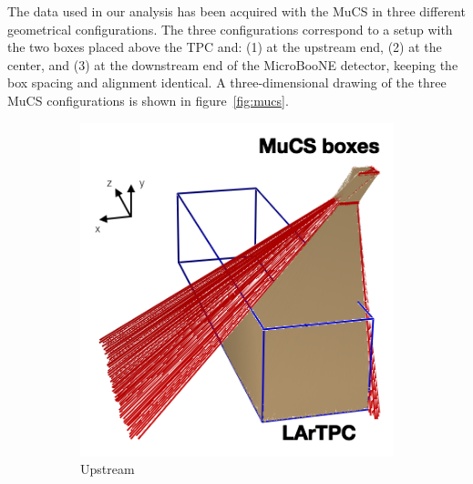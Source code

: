 \documentclass[a4paper,11pt]{article}
\begin{document}
The data used in our analysis has been acquired with the MuCS in three different geometrical configurations. The three configurations correspond to a setup with the two boxes placed above the TPC and: (1) at the upstream end, (2) at the center, and (3) at the downstream end of the MicroBooNE detector, keeping the box spacing and alignment identical.
A three-dimensional drawing of the three MuCS configurations is shown in figure~\ref{fig:mucs}.

\begin{figure}[htbp]
  \begin{subfigure}{0.30\textwidth}
    \includegraphics[width=\linewidth]{figures/upstream.png}
    \caption{Upstream} \label{fig:upstream}
  \end{subfigure}
  \begin{subfigure}{0.30\textwidth}

\end{subfigure}
\end{figure}
\end{document}

